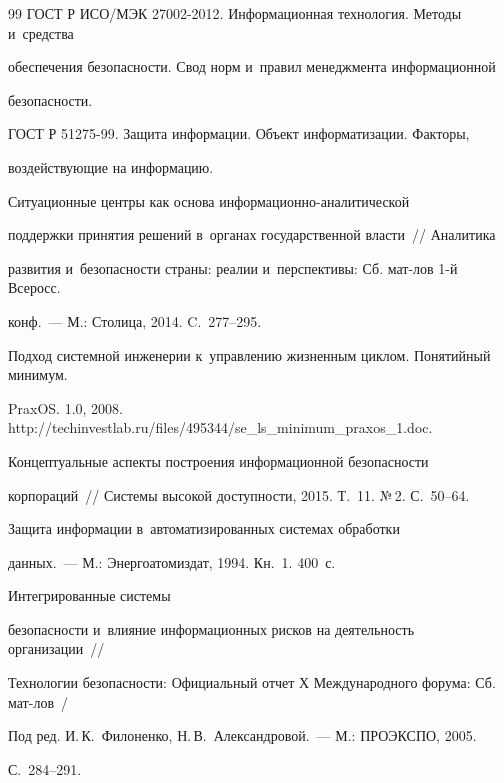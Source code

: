 {{\begin{thebibliography}{99}
ГОСТ Р ИСО/МЭК 27002-2012. Информационная технология. Методы и~средства 

обеспечения безопасности. Свод норм и~правил менеджмента информационной 

безопасности. 


ГОСТ Р 51275-99. Защита информации. Объект информатизации. Факторы, 

воздействующие на информацию. 


 Ситуационные центры как основа информационно-аналитической 

поддержки принятия решений в~органах государственной власти~/\!\!/ Аналитика 

развития и~безопасности страны: реалии и~перспективы: Сб. мат-лов 1-й Всеросс. 

конф.~--- М.: Столица, 2014. C.~277--295. 


Подход системной инженерии к~управлению жизненным циклом. Понятийный минимум. 

PraxOS. 1.0, 2008. {\sf http://techinvestlab.ru/files/495344/se\_ls\_\linebreak minimum\_praxos\_1.doc}. 


 Концептуальные аспекты построения информационной безопасности 

корпораций~/\!\!/ Системы высокой доступности, 2015. Т.~11. №\,2. С.~50--64.


 Защита информации в~автоматизированных сис\-те\-мах обработки 

данных.~--- М.: Энергоатомиздат, 1994.  Кн.~1. 400~с. 


 Интегрированные сис\-те\-мы 

без\-опас\-ности и~влияние информационных рисков на деятельность организации~/\!\!/ 

Технологии безопасности: Официальный отчет Х Международного форума: Сб. мат-лов~/ 

Под ред. И.\,К.~Филоненко, Н.\,В.~Александровой.~--- М.: ПРОЭКСПО, 2005.  

С.~284--291. 



\end{thebibliography}}}
